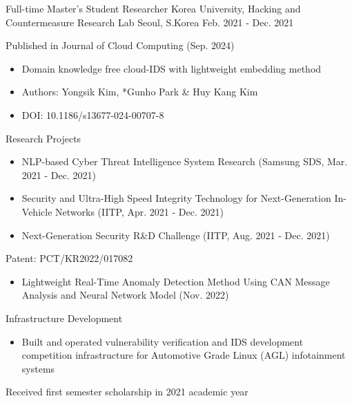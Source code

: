 \begin{cventries}
\cventry
    {Full-time Master's Student Researcher} %
    {Korea University, Hacking and Countermeasure Research Lab} %
    {Seoul, S.Korea} %
    {Feb. 2021 - Dec. 2021} %
    {
      \begin{cvitems}
        \item {Published in Journal of Cloud Computing (Sep. 2024)
          \begin{itemize}
            \item {Domain knowledge free cloud-IDS with lightweight embedding method}
            \item {Authors: Yongsik Kim, *Gunho Park \& Huy Kang Kim}
            \item {DOI: 10.1186/s13677-024-00707-8}
          \end{itemize}
        }
        \item {Research Projects
          \begin{itemize}
            \item {NLP-based Cyber Threat Intelligence System Research (Samsung SDS, Mar. 2021 - Dec. 2021)}
            \item {Security and Ultra-High Speed Integrity Technology for Next-Generation In-Vehicle Networks (IITP, Apr. 2021 - Dec. 2021)}
            \item {Next-Generation Security R\&D Challenge (IITP, Aug. 2021 - Dec. 2021)}
          \end{itemize}
        }
        \item {Patent: PCT/KR2022/017082
          \begin{itemize}
            \item {Lightweight Real-Time Anomaly Detection Method Using CAN Message Analysis and Neural Network Model (Nov. 2022)}
          \end{itemize}
        }
        \item {Infrastructure Development
          \begin{itemize}
            \item {Built and operated vulnerability verification and IDS development competition infrastructure for Automotive Grade Linux (AGL) infotainment systems}
          \end{itemize}
        }
        \item {Received first semester scholarship in 2021 academic year}
      \end{cvitems}
    }


\end{cventries}
